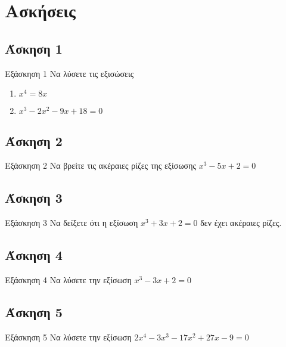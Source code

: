 \documentclass[greek]{beamer}
\begin{document}
\section{Ασκήσεις}
\subsection{Άσκηση 1}
\begin{frame}[label=Άσκηση1,t]{Εξάσκηση 1}
 Να λύσετε τις εξισώσεις
 \begin{enumerate}
  \item<1-> $x^4=8x$
  \item<2-> $x^3-2x^2-9x+18=0$
 \end{enumerate}

\end{frame}

\subsection{Άσκηση 2}
\begin{frame}[label=Άσκηση2,t]{Εξάσκηση 2}
 Να βρείτε τις ακέραιες ρίζες της εξίσωσης $x^3-5x+2=0$

\end{frame}

\subsection{Άσκηση 3}
\begin{frame}[label=Άσκηση3,t]{Εξάσκηση 3}
 Να δείξετε ότι η εξίσωση $x^3+3x+2=0$ δεν έχει ακέραιες ρίζες.

\end{frame}

\subsection{Άσκηση 4}
\begin{frame}[label=Άσκηση4,t]{Εξάσκηση 4}
 Να λύσετε την εξίσωση $x^3-3x+2=0$

\end{frame}

\subsection{Άσκηση 5}
\begin{frame}[label=Άσκηση5,t]{Εξάσκηση 5}
 Να λύσετε την εξίσωση $2x^4-3x^3-17x^2+27x-9=0$

\end{frame}
\end{document}
